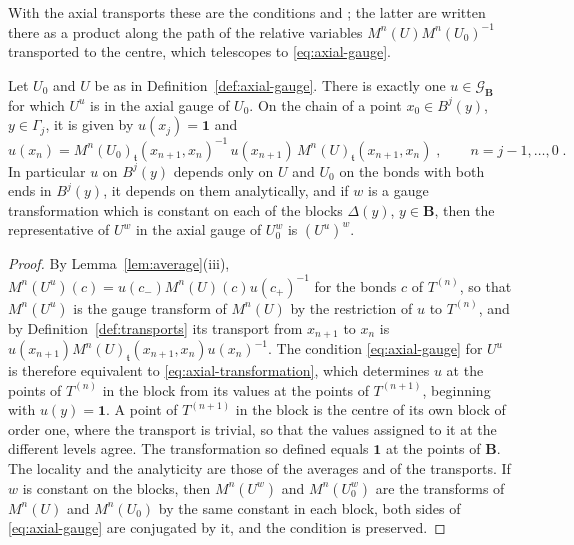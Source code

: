 \documentclass[11pt]{preprint}
\newcommand{\id}{\mathbf 1}
\numberwithin{equation}{section}
\begin{document}
With the axial transports these are the conditions \cite[(1.15), p.~78]{BalabanREG} and \cite[(1.19), (1.20), p.~79]{BalabanREG}; the latter are written there as a product along the path of the relative variables $M^n(U)M^n(U_0)^{-1}$ transported to the centre, which telescopes to \eqref{eq:axial-gauge}.

\begin{lemma}\label{lem:axial-representative}
Let $U_0$ and $U$ be as in Definition~\ref{def:axial-gauge}. There is exactly one $u \in \mathcal G_{\mathbf B}$ for which $U^u$ is in the axial gauge of $U_0$. On the chain of a point $x_0 \in B^j(y)$, $y \in \Gamma_j$, it is given by $u(x_j) = \id$ and
\begin{equation}\label{eq:axial-transformation}
    u(x_n) = M^n(U_0)_{\mathfrak t}(x_{n+1}, x_n)^{-1}\,u(x_{n+1})\,M^n(U)_{\mathfrak t}(x_{n+1}, x_n)\;,
    \qquad
    n = j - 1, \dots, 0\;.
\end{equation}
In particular $u$ on $B^j(y)$ depends only on $U$ and $U_0$ on the bonds with both ends in $B^j(y)$, it depends on them analytically, and if $w$ is a gauge transformation which is constant on each of the blocks $\Delta(y)$, $y \in \mathbf B$, then the representative of $U^w$ in the axial gauge of $U_0^w$ is $(U^u)^w$.
\end{lemma}

\begin{proof}
By Lemma~\ref{lem:average}(iii), $M^n(U^u)(c) = u(c_-)M^n(U)(c)u(c_+)^{-1}$ for the bonds $c$ of $T^{(n)}$, so that $M^n(U^u)$ is the gauge transform of $M^n(U)$ by the restriction of $u$ to $T^{(n)}$, and by Definition~\ref{def:transports} its transport from $x_{n+1}$ to $x_n$ is $u(x_{n+1})M^n(U)_{\mathfrak t}(x_{n+1}, x_n)u(x_n)^{-1}$. The condition \eqref{eq:axial-gauge} for $U^u$ is therefore equivalent to \eqref{eq:axial-transformation}, which determines $u$ at the points of $T^{(n)}$ in the block from its values at the points of $T^{(n+1)}$, beginning with $u(y) = \id$. A point of $T^{(n+1)}$ in the block is the centre of its own block of order one, where the transport is trivial, so that the values assigned to it at the different levels agree. The transformation so defined equals $\id$ at the points of $\mathbf B$. The locality and the analyticity are those of the averages and of the transports. If $w$ is constant on the blocks, then $M^n(U^w)$ and $M^n(U_0^w)$ are the transforms of $M^n(U)$ and $M^n(U_0)$ by the same constant in each block, both sides of \eqref{eq:axial-gauge} are conjugated by it, and the condition is preserved.
\end{proof}
\end{document}
